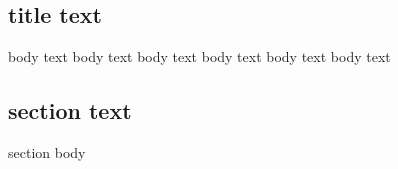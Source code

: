 \begin{myenv}
\chapter{title text} body text body text body text body text body text body text \section{section text} section body
\end{myenv}
